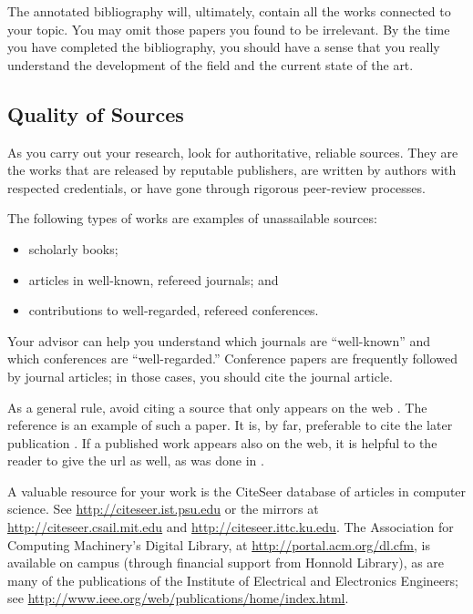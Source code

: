 \documentclass[finalcopy]{srpaper}
\begin{document}
The annotated bibliography will, ultimately, contain all the
works connected to your topic. You may omit those papers you
found to be irrelevant. By the time you have completed the
bibliography, you should have a sense that you really
understand the development of the field and the current
state of the art.

\subsection{Quality of Sources}
As you carry out your research, look for authoritative,
reliable sources. They are the works that are released by
reputable publishers, are written by authors with respected
credentials, or have gone through rigorous peer-review
processes.

The following types of works are examples of unassailable
sources:
\begin{itemize}
\item scholarly books;
\item articles in well-known, refereed journals; and
\item contributions to well-regarded, refereed conferences.
\end{itemize}
Your advisor
can help you understand which journals are
``well-known'' and which conferences are ``well-regarded.''
Conference papers are frequently followed
by journal articles; in those cases, you should cite the
journal article.

As a general rule, avoid citing a source that only appears
on the web \cite{SeniorExerciseGuide}.  The reference
\cite{AKS2002} is an example of such a paper. It is, by far,
preferable to cite the later publication \cite{AKS2004}. If
a published work appears also on the web, it is helpful to
the reader to give the url as well, as was done in
\cite{AKS2004}.

A valuable resource for your work is the CiteSeer database
of articles in computer science. See
\url{http://citeseer.ist.psu.edu} or the mirrors at
\url{http://citeseer.csail.mit.edu} and
\url{http://citeseer.ittc.ku.edu}. The Association for
Computing Machinery's Digital Library, at
\url{http://portal.acm.org/dl.cfm}, is available on campus
(through financial support from
Honnold Library), as are many of the publications of the
Institute of Electrical and Electronics Engineers; see
\url{http://www.ieee.org/web/publications/home/index.html}.
\end{document}
